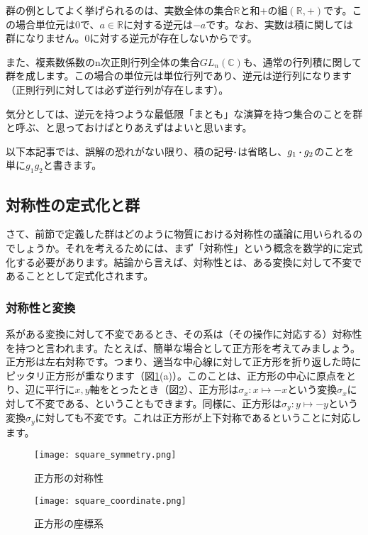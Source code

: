 \documentclass[uplatex,dvipdfmx,a4j,openany]{jsarticle}
\begin{document}
群の例としてよく挙げられるのは、実数全体の集合$\mathbb{R}$と和$+$の組$(\mathbb{R}, +)$です。この場合単位元は0で、$a\in \mathbb{R}$に対する逆元は$-a$です。なお、実数は積に関しては群になりません。0に対する逆元が存在しないからです。

また、複素数係数のn次正則行列全体の集合$GL_n(\mathbb{C})$も、通常の行列積に関して群を成します。この場合の単位元は単位行列であり、逆元は逆行列になります（正則行列に対しては必ず逆行列が存在します）。

気分としては、逆元を持つような最低限「まとも」な演算を持つ集合のことを群と呼ぶ、と思っておけばとりあえずはよいと思います。

以下本記事では、誤解の恐れがない限り、積の記号$\vdot$は省略し、$g_1\vdot g_2$のことを単に$g_1g_2$と書きます。

\subsection{対称性の定式化と群}
さて、前節で定義した群はどのように物質における対称性の議論に用いられるのでしょうか。それを考えるためには、まず「対称性」という概念を数学的に定式化する必要があります。結論から言えば、対称性とは、ある変換に対して不変であることとして定式化されます。

\subsubsection{対称性と変換}
系がある変換に対して不変であるとき、その系は（その操作に対応する）対称性を持つと言われます。たとえば、簡単な場合として正方形を考えてみましょう。正方形は左右対称です。つまり、適当な中心線に対して正方形を折り返した時にピッタリ正方形が重なります（図\ref{fig:square_symmetry}(a)）。このことは、正方形の中心に原点をとり、辺に平行に$x,y$軸をとったとき（図\ref{fig:square_coordinate}）、正方形は$\sigma_x:x\mapsto -x$という変換$\sigma_x$に対して不変である、ということもできます。同様に、正方形は$\sigma_y:y\mapsto -y$という変換$\sigma_y$に対しても不変です。これは正方形が上下対称であるということに対応します。

\begin{figure}[htbp]
	\centering
	\texttt{[image: square\_symmetry.png]}
	\caption{正方形の対称性}
	\label{fig:square_symmetry}
\end{figure}

\begin{figure}[htbp]
	\centering
	\texttt{[image: square\_coordinate.png]}
	\caption{正方形の座標系}
	\label{fig:square_coordinate}
\end{figure}
\end{document}
